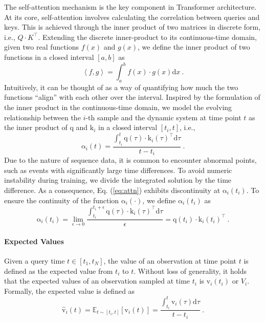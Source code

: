\documentclass{article}
\begin{document}
The self-attention mechanism is the key component in Transformer architecture. 
At its core, self-attention involves calculating the correlation between queries and keys. 
This is achieved through the inner product of two matrices in discrete form, i.e., $Q \cdot K^\top$. 
Extending the discrete inner-product to its continuous-time domain, given two real functions $f(x)$ and $g(x)$, we define the inner product of two functions in a closed interval $[a, b]$ as
\begin{equation}
    \left< f, g \right> = \int_{a}^b f(x) \cdot g(x) \text{d} x ~.
\end{equation}
Intuitively, it can be thought of as a way of quantifying how much the two functions ``align'' with each other over the interval. 
Inspired by the formulation of the inner product in the continuous-time domain, we model the evolving relationship between the $i$-th sample and the dynamic system at time point $t$ as the inner product of $\boldsymbol{\mathrm{q}}$ and $\boldsymbol{\mathrm{k}}_i$ in a closed interval $[t_i, t]$, i.e.,
\begin{equation}
    \boldsymbol{\mathrm{\alpha}}_{i}(t) =  \frac{\int_{t_i}^{t} \boldsymbol{\mathrm{q}}(\tau) \cdot \boldsymbol{\mathrm{k}}_i(\tau)^\top \text{d}\tau}{t - t_i} ~.
\label{eq:attn}
\end{equation}
Due to the nature of sequence data, it is common to encounter abnormal points, such as events with significantly large time differences. To avoid numeric instability during training, we divide the integrated solution by the time difference. As a consequence, Eq. (\ref{eq:attn}) exhibits discontinuity at $\boldsymbol{\mathrm{\alpha}}_i(t_i)$. To ensure the continuity of the function $\boldsymbol{\mathrm{\alpha}}_i(\cdot)$, we define $\boldsymbol{\mathrm{\alpha}}_i(t_i)$ as
\begin{equation}
\boldsymbol{\mathrm{\alpha}}_i(t_i) = \lim_{\epsilon \rightarrow 0} \frac{\int_{t_i}^{t_i + \epsilon} \boldsymbol{\mathrm{q}}(\tau) \cdot \boldsymbol{\mathrm{k}}_i(\tau)^\top \text{d}\tau}{\epsilon} = \boldsymbol{\mathrm{q}}(t_i) \cdot \boldsymbol{\mathrm{k}}_i(t_i)^\top ~.
\label{eq:ii}
\end{equation}

\paragraph{Expected Values}

Given a query time $t \in [t_1, t_N]$, the value of an observation at time point $t$ is defined as the expected value from $t_i$ to $t$. 
Without loss of generality, it holds that the expected values of an observation sampled at time $t_i$ is $\boldsymbol{\mathrm{v}}_i(t_i)$ or $V_i$. 
Formally, the expected value is defined as
\begin{equation}
    \widehat{\boldsymbol{\mathrm{v}}}_{i}(t) = \mathbb{E}_{t \sim [t_i, t]} \left[ \boldsymbol{\mathrm{v}}_i(t) \right] = \frac{\int_{t_i}^{t} \boldsymbol{\mathrm{v}}_i(\tau) \text{d} \tau}{t - t_i} ~.
    \label{eq:vv}
\end{equation}
\end{document}

